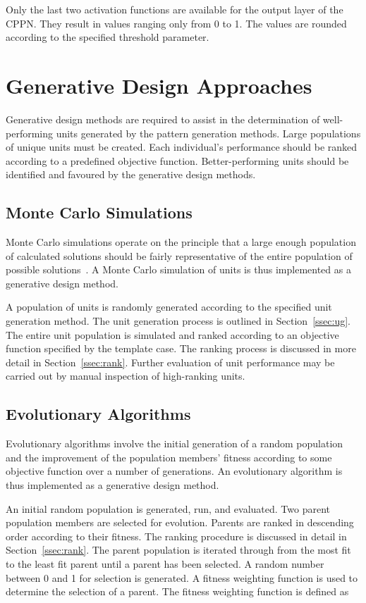 Only the last two activation functions are available for the output layer of the CPPN. They result in values ranging only from 0 to 1. The values are rounded according to the specified threshold parameter.

\section{Generative Design Approaches}
\label{sec:GD}

Generative design methods are required to assist in the determination of well-performing units generated by the pattern generation methods. Large populations of unique units must be created. Each individual's performance should be ranked according to a predefined objective function. Better-performing units should be identified and favoured by the generative design methods.

\subsection{Monte Carlo Simulations}

Monte Carlo simulations operate on the principle that a large enough population of calculated solutions should be fairly representative of the entire population of possible solutions~\citep{Metropolis1949}. A Monte Carlo simulation of units is thus implemented as a generative design method.

A population of units is randomly generated according to the specified unit generation method. The unit generation process is outlined in Section~\ref{ssec:ug}. The entire unit population is simulated and ranked according to an objective function specified by the template case. The ranking process is discussed in more detail in Section~\ref{ssec:rank}. Further evaluation of unit performance may be carried out by manual inspection of high-ranking units.

\subsection{Evolutionary Algorithms}
\label{sec:EA}

Evolutionary algorithms involve the initial generation of a random population and the improvement of the population members' fitness according to some objective function over a number of generations. An evolutionary algorithm is thus implemented as a generative design method.

An initial random population is generated, run, and evaluated. Two parent population members are selected for evolution. Parents are ranked in descending order according to their fitness. The ranking procedure is discussed in detail in Section~\ref{ssec:rank}. The parent population is iterated through from the most fit to the least fit parent until a parent has been selected. A random number between 0 and 1 for selection is generated. A fitness weighting function is used to determine the selection of a parent. The fitness weighting function is defined as

